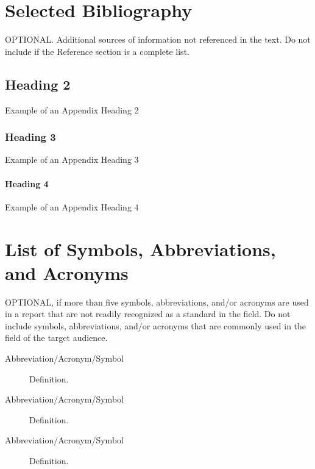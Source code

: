 \begin{appendices}
\tagpdfparaOff {} %
\section{Selected Bibliography}
\label{app:bib}
\tagmcend
 \tagstructend
  \tagpdfparaOn
OPTIONAL. Additional sources of information not referenced in the text.  Do not include if the Reference section is a complete list.
 
 
\tagpdfparaOff {}
\subsection{Heading 2}
\tagmcend
 \tagstructend
  \tagpdfparaOn
Example of an Appendix Heading 2
  
  
 \tagpdfparaOff {}
\subsubsection{Heading 3}
\tagmcend
 \tagstructend
 \tagpdfparaOn
Example of an Appendix Heading 3


\tagpdfparaOff {}
\paragraph{Heading 4}
\tagmcend
 \tagstructend
 \tagpdfparaOn
Example of an Appendix Heading 4

 \newpage
 \tagpdfparaOff {}
\section{List of Symbols, Abbreviations, and Acronyms}
\label{app:abbr}
\tagmcend
 \tagstructend
 \tagpdfparaOn
OPTIONAL, if more than five symbols, abbreviations, and/or acronyms are used in a report that are not readily recognized as a standard in the field. Do not include symbols, abbreviations, and/or acronyms that are commonly used in the field of the target audience.


\begin{description}
\item[Abbreviation/Acronym/Symbol] Definition.
\item[Abbreviation/Acronym/Symbol] Definition.
\item[Abbreviation/Acronym/Symbol] Definition.
\end{description}


\end{appendices}
